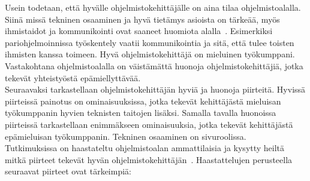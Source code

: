 \documentclass[finnish]{../tktltiki2}
\theoremstyle{definition}
\theoremstyle{remark}
\begin{document}
Usein todetaan, että hyvälle ohjelmistokehittäjälle on aina tilaa ohjelmistoalalla.
Siinä missä tekninen osaaminen ja hyvä tietämys asioista on
tärkeää, myös ihmistaidot ja kommunikointi ovat saaneet
huomiota alalla~\cite{Hall:2007:CNT:1235000.1235043}. Esimerkiksi
pariohjelmoinnissa työskentely vaatii kommunikointia ja sitä, että
tulee toisten ihmisten kanssa toimeen. Hyvä ohjelmistokehittäjä
on mieluinen työkumppani. Vastakohtana ohjelmistoalalla
on väistämättä huonoja ohjelmistokehittäjiä, jotka tekevät
yhteistyöstä epämiellyttävää.\\

Seuraavaksi tarkastellaan ohjelmistokehittäjän hyviä ja huonoja
piirteitä. Hyvissä piirteissä painotus on ominaisuuksissa, jotka
tekevät kehittäjästä mieluisan työkumppanin hyvien teknisten
taitojen lisäksi. Samalla tavalla huonoissa piirteissä tarkastellaan
enimmäkseen ominaisuuksia, jotka tekevät kehittäjästä epämieluisan työkumppanin. Tekninen osaaminen on sivuroolissa.\\

Tutkimuksissa
on haastateltu ohjelmistoalan ammattilaisia ja kysytty heiltä mitkä
piirteet tekevät hyvän ohjelmistokehittäjän~\cite{Begel:2008:PPW:1414004.1414026,Hall:2007:CNT:1235000.1235043}. Haastattelujen perusteella seuraavat piirteet ovat tärkeimpiä:
\end{document}
